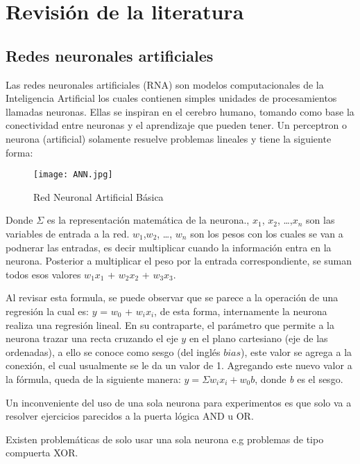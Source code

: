 \chapter{Revisión de la literatura}
  \section{Redes neuronales artificiales}
  
    Las redes neuronales artificiales (RNA) son modelos computacionales de la Inteligencia Artificial los cuales contienen simples unidades de procesamientos llamadas neuronas.  Ellas se inspiran en el cerebro humano, tomando como base la conectividad entre neuronas y el aprendizaje que pueden tener.  Un perceptron o neurona (artificial) solamente resuelve problemas lineales y tiene la siguiente forma:
    
    \begin{figure}[H]
      \centering
      \texttt{[image: ANN.jpg]}
      \caption{Red Neuronal Artificial B\'asica}
      \label{fig:fig1}
    \end{figure}

    Donde $\Sigma$ es la representación matemática de la neurona.,  $x_1$, $x_2$,  \dots  ,$x_n$ son las variables de entrada a la red.  $w_1$,$w_2$,  \dots , $w_n$ son los pesos con los cuales se van a podnerar las entradas, es decir multiplicar cuando la información entra en la neurona. Posterior a multiplicar el peso por la entrada correspondiente,  se suman todos esos valores $w_1$$x_1$ + $w_2$$x_2$ + $w_3$$x_3$.

    Al revisar esta formula, se puede observar que se parece a la operación de una regresión la cual es:  $y$ = $w_0$ + $w_i$$x_i$,  de esta forma, internamente la neurona realiza una regresión lineal. En su contraparte, el parámetro que permite a la neurona trazar una recta cruzando el eje $y$ en el plano cartesiano (eje de las ordenadas), a ello se conoce como sesgo (del inglés $bias$),  este valor se agrega a la conexión, el cual usualmente se le da un valor de 1.
    Agregando este nuevo valor a la fórmula, queda de la siguiente manera: $ y = \Sigma w_i x_i + w_0 b$,  donde \textit{b} es el sesgo.

    Un inconveniente del uso de una sola neurona para experimentos es que solo va a resolver ejercicios parecidos a la puerta lógica AND u OR.
    
    Existen problemáticas de solo usar una sola neurona e.g problemas de tipo compuerta XOR.

